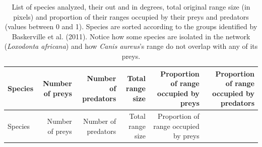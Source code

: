 \documentclass[10pt,oneside]{article}
\begin{document}
\hypertarget{tbl:everyone}{}
\begin{longtable}[]{@{}lrrrrr@{}}
\caption{\label{tbl:everyone}List of species analyzed, their out and in
degrees, total original range size (in pixels) and proportion of their
ranges occupied by their preys and predators (values between 0 and 1).
Species are sorted according to the groups identified by Baskerville et
al. (2011). Notice how some species are isolated in the network
(\emph{Loxodonta africana}) and how \emph{Canis aureus}'s range do not
overlap with any of its preys.}\tabularnewline
\toprule
\begin{minipage}[b]{0.28\columnwidth}\raggedright
Species\strut
\end{minipage} & \begin{minipage}[b]{0.10\columnwidth}\raggedleft
Number of preys\strut
\end{minipage} & \begin{minipage}[b]{0.10\columnwidth}\raggedleft
Number of predators\strut
\end{minipage} & \begin{minipage}[b]{0.10\columnwidth}\raggedleft
Total range size\strut
\end{minipage} & \begin{minipage}[b]{0.13\columnwidth}\raggedleft
Proportion of range occupied by preys\strut
\end{minipage} & \begin{minipage}[b]{0.13\columnwidth}\raggedleft
Proportion of range occupied by predators\strut
\end{minipage}\tabularnewline
\midrule
\endfirsthead
\toprule
\begin{minipage}[b]{0.28\columnwidth}\raggedright
Species\strut
\end{minipage} & \begin{minipage}[b]{0.10\columnwidth}\raggedleft
Number of preys\strut
\end{minipage} & \begin{minipage}[b]{0.10\columnwidth}\raggedleft
Number of predators\strut
\end{minipage} & \begin{minipage}[b]{0.10\columnwidth}\raggedleft
Total range size\strut
\end{minipage} & \begin{minipage}[b]{0.13\columnwidth}\raggedleft
Proportion of range occupied by preys\strut
\end{minipage} & \begin{minipage}[b]{0.13\columnwidth}\raggedleft

\end{minipage}
\end{longtable}
\end{document}
